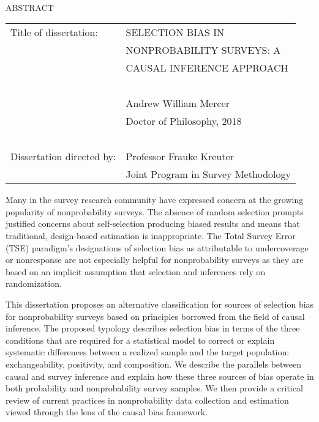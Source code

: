 
\hbox{\ }

\renewcommand{\baselinestretch}{1}
\small \normalsize

\begin{center}
\large{{ABSTRACT}}

\vspace{3em}

\end{center}
\hspace{-.15in}
\begin{tabular}{ll}
Title of dissertation:    & {\large  SELECTION BIAS IN }\\
&                     {\large  NONPROBABILITY SURVEYS: A } \\
&                     {\large  CAUSAL INFERENCE APPROACH} \\
\ \\
&                          {\large  Andrew William Mercer} \\
&                           {\large Doctor of Philosophy, 2018} \\
\ \\
Dissertation directed by: & {\large Professor Frauke Kreuter} \\
&               {\large  Joint Program in Survey Methodology } \\
\end{tabular}

\vspace{3em}

\renewcommand{\baselinestretch}{2}
\large \normalsize

Many in the survey research community have expressed concern at the growing popularity of nonprobability surveys. The absence of random selection prompts justified concerns about self-selection producing biased results and means that traditional, design-based estimation is inappropriate. The Total Survey Error (TSE) paradigm’s designations of selection bias as attributable to undercoverage or nonresponse are not especially helpful for nonprobability surveys as they are based on an implicit assumption that selection and inferences rely on randomization. 

This dissertation proposes an alternative classification for sources of selection bias for nonprobability surveys based on principles borrowed from the field of causal inference. The  proposed typology describes selection bias in terms of the three conditions that are required for a statistical model to correct or explain systematic differences between a realized sample and the target population: exchangeability, positivity, and composition. We describe the parallels between causal and survey inference and explain how these three sources of bias operate in both probability and nonprobability survey samples. We then provide a critical review of current practices in nonprobability data collection and estimation viewed through the lens of the causal bias framework. 

